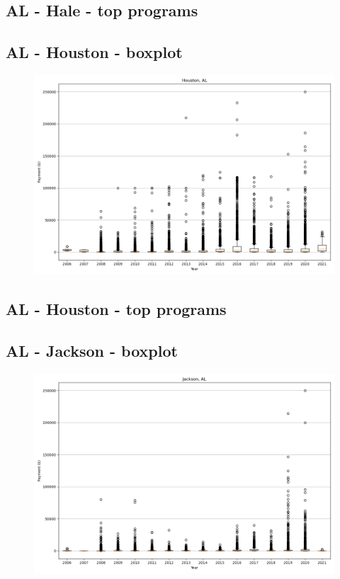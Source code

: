 \subsection*{AL - Hale - top programs}

\newpage
\subsection*{AL - Houston - boxplot}
\begin{figure}[h]
\centering
\includegraphics[width=7in]{../output/boxplots/counties/Houston-AL_boxplot.png}
\end{figure}


\subsection*{AL - Houston - top programs}

\newpage
\subsection*{AL - Jackson - boxplot}
\begin{figure}[h]
\centering
\includegraphics[width=7in]{../output/boxplots/counties/Jackson-AL_boxplot.png}
\end{figure}


